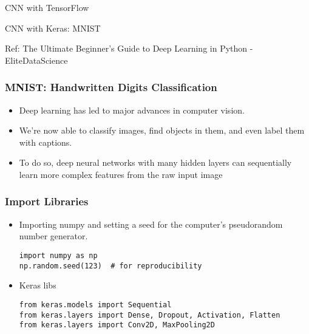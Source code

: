\begin{frame}
  \begin{center}
    {\Large CNN with TensorFlow}
    
  \end{center}
\end{frame}

\begin{frame}
  \begin{center}
    {\Large CNN with Keras: MNIST}
    
    {Ref: The Ultimate Beginner's Guide to Deep Learning in Python - EliteDataScience}
  \end{center}
\end{frame}

\begin{frame}[fragile] \frametitle{MNIST: Handwritten Digits Classification}
\begin{itemize}
\item Deep learning has led to major advances in computer vision. 
\item We're now able to classify images, find objects in them, and even label them with captions. 
\item To do so, deep neural networks with many hidden layers can sequentially learn more complex features from the raw input image
\end{itemize}
\end{frame}

\begin{frame}[fragile] \frametitle{Import Libraries}

\begin{itemize}
\item Importing numpy and setting a seed for the computer's pseudorandom number generator.
\begin{lstlisting}
import numpy as np
np.random.seed(123)  # for reproducibility
\end{lstlisting}
\item Keras libs
\begin{lstlisting}
from keras.models import Sequential
from keras.layers import Dense, Dropout, Activation, Flatten
from keras.layers import Conv2D, MaxPooling2D
\end{lstlisting}
\end{itemize}
\end{frame}

